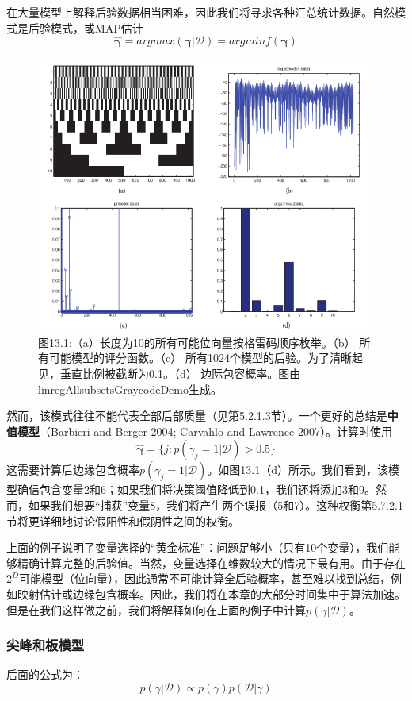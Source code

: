 \documentclass[a4paper]{article}
\begin{document}
在大量模型上解释后验数据相当困难，因此我们将寻求各种汇总统计数据。自然模式是后验模式，或MAP估计
\begin{equation}
	\boldsymbol{\hat{\gamma}}=argmax(\boldsymbol{\gamma} | \mathcal{D})=argminf(\boldsymbol{\gamma})\tag{13.3}
\end{equation}

\begin{figure}[h]
	\centering
	\includegraphics[width=0.7\linewidth]{fig13/figure1}
	\caption*{图13.1:（a）长度为10的所有可能位向量按格雷码顺序枚举。（b） 所有可能模型的评分函数。（c） 所有1024个模型的后验。为了清晰起见，垂直比例被截断为0.1。（d） 边际包容概率。图由linregAllsubsetsGraycodeDemo生成。}
\end{figure}
然而，该模式往往不能代表全部后部质量（见第5.2.1.3节）。一个更好的总结是\textbf{中值模型}（Barbieri and Berger 2004; Carvahlo and Lawrence 2007）。计算时使用
\begin{equation}
	\boldsymbol{\hat{\gamma}}=\{ j:p(\gamma_j=1|\mathcal{D})>0.5\}\tag{13.4}
\end{equation}
这需要计算后边缘包含概率$p(\gamma_j=1|\mathcal{D})$。如图13.1（d）所示。我们看到，该模型确信包含变量2和6；如果我们将决策阈值降低到0.1，我们还将添加3和9。然而，如果我们想要“捕获”变量8，我们将产生两个误报（5和7）。这种权衡第5.7.2.1节将更详细地讨论假阳性和假阴性之间的权衡。 

上面的例子说明了变量选择的“黄金标准”：问题足够小（只有10个变量），我们能够精确计算完整的后验值。当然，变量选择在维数较大的情况下最有用。由于存在$2^D$可能模型（位向量），因此通常不可能计算全后验概率，甚至难以找到总结，例如映射估计或边缘包含概率。因此，我们将在本章的大部分时间集中于算法加速。但是在我们这样做之前，我们将解释如何在上面的例子中计算$p(\gamma |\mathcal{D})$。 

\subsubsection{尖峰和板模型 }
后面的公式为： 
\begin{equation}
	p(\gamma |\mathcal{D})\varpropto p(\gamma )p(\mathcal{D}|\gamma )\tag{13.5}
\end{equation}
\end{document}
